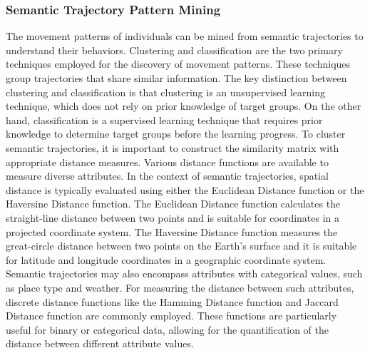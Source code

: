 \documentclass{article}
\theoremstyle{remark}
\begin{document}
\subsubsection{Semantic Trajectory Pattern Mining}
The movement patterns of individuals can be mined from semantic trajectories to understand their behaviors. Clustering and classification are the two primary techniques employed for the discovery of movement patterns. These techniques group trajectories that share similar information. The key distinction between clustering and classification is that clustering is an unsupervised learning technique, which does not rely on prior knowledge of target groups. On the other hand, classification is a supervised learning technique that requires prior knowledge to determine target groups before the learning progress. To cluster semantic trajectories, it is important to construct the similarity matrix with appropriate distance measures. Various distance functions are available to measure diverse attributes. In the context of semantic trajectories, spatial distance is typically evaluated using either the Euclidean Distance function or the Haversine Distance function. The Euclidean Distance function calculates the straight-line distance between two points and is suitable for coordinates in a projected coordinate system. The Haversine Distance function measures the great-circle distance between two points on the Earth's surface and it is suitable for latitude and longitude coordinates in a geographic coordinate system. Semantic trajectories may also encompass attributes with categorical values, such as place type and weather. For measuring the distance between such attributes, discrete distance functions like the Hamming Distance function and Jaccard Distance function are commonly employed. These functions are particularly useful for binary or categorical data, allowing for the quantification of the distance between different attribute values.
\end{document}
